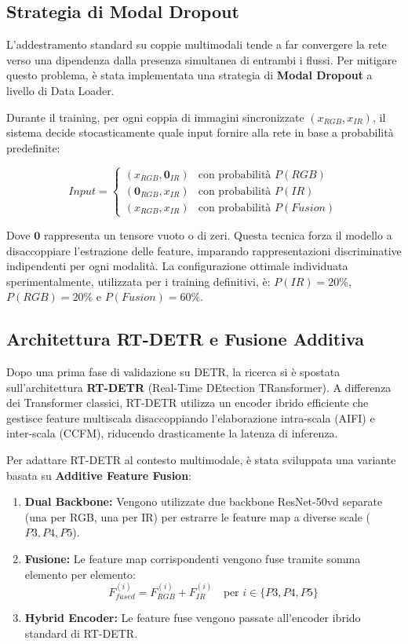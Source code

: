 \documentclass[a4paper,12pt]{article}
\begin{document}
\newpage

\subsection{Strategia di Modal Dropout}
L'addestramento standard su coppie multimodali tende a far convergere la rete verso una dipendenza dalla presenza simultanea di entrambi i flussi. Per mitigare questo problema, è stata implementata una strategia di \textbf{Modal Dropout} a livello di Data Loader.

Durante il training, per ogni coppia di immagini sincronizzate $(x_{RGB}, x_{IR})$, il sistema decide stocasticamente quale input fornire alla rete in base a probabilità predefinite:

\begin{equation}
    Input = \begin{cases} 
    (x_{RGB}, \mathbf{0}_{IR}) & \text{con probabilità } P(RGB) \\
    (\mathbf{0}_{RGB}, x_{IR}) & \text{con probabilità } P(IR) \\
    (x_{RGB}, x_{IR}) & \text{con probabilità } P(Fusion) 
    \end{cases}
\end{equation}

Dove $\mathbf{0}$ rappresenta un tensore vuoto o di zeri. Questa tecnica forza il modello a disaccoppiare l'estrazione delle feature, imparando rappresentazioni discriminative indipendenti per ogni modalità. La configurazione ottimale individuata sperimentalmente, utilizzata per i training definitivi, è: $P(IR)=20\%$, $P(RGB)=20\%$ e $P(Fusion)=60\%$.

\subsection{Architettura RT-DETR e Fusione Additiva}
Dopo una prima fase di validazione su DETR, la ricerca si è spostata sull'architettura \textbf{RT-DETR} (Real-Time DEtection TRansformer). A differenza dei Transformer classici, RT-DETR utilizza un encoder ibrido efficiente che gestisce feature multiscala disaccoppiando l'elaborazione intra-scala (AIFI) e inter-scala (CCFM), riducendo drasticamente la latenza di inferenza.

Per adattare RT-DETR al contesto multimodale, è stata sviluppata una variante basata su \textbf{Additive Feature Fusion}:
\begin{enumerate}
    \item \textbf{Dual Backbone:} Vengono utilizzate due backbone ResNet-50vd separate (una per RGB, una per IR) per estrarre le feature map a diverse scale ($P3, P4, P5$).
    \item \textbf{Fusione:} Le feature map corrispondenti vengono fuse tramite somma elemento per elemento:
    $$ F_{fused}^{(i)} = F_{RGB}^{(i)} + F_{IR}^{(i)} \quad \text{per } i \in \{P3, P4, P5\} $$
    \item \textbf{Hybrid Encoder:} Le feature fuse vengono passate all'encoder ibrido standard di RT-DETR.
\end{enumerate}
\end{document}
